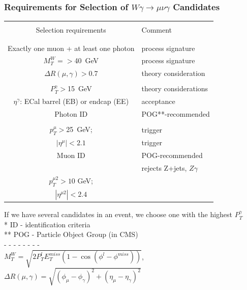 \begin{frame}\frametitle{Requirements for Selection of $W\gamma\rightarrow\mu\nu\gamma$ Candidates}
  \begin{table}[h]
     \tiny
     \begin{center}
     \begin{tabular}{|c|l|}
     \hline
      &  \\
     {\scriptsize{Selection requirements}} & {\scriptsize{Comment}} \\  
     &  \\ \hline

    {\scriptsize\bfseries\color{blue}{Event level selection criteria:}}  & \\ 
    Exactly one muon + at least one photon  & process signature\\  
     $M_T^W=>$40~GeV & process signature\\ 
     $\Delta{R}(\mu,\gamma)>$0.7 & theory consideration\\  \hline

     {\scriptsize\bfseries\color{blue}{Photon selection:}} & \\
     {\tiny{$P_T^{\gamma}>$15~GeV}} & theory considerations \\ 
     {\tiny{$\eta^{\gamma}$: ECal barrel (EB) or endcap (EE)}} & acceptance \\ 
     {\tiny{Photon ID}} & POG**-recommended \\ \hline

      {\scriptsize\bfseries\color{blue}{Muon selection:}} & \\
      \tiny{$p_T^{\mu}>$25~GeV;} & trigger\\ 
      \tiny{$|\eta^{\mu}|<2.1$} & trigger\\ 
      Muon ID & POG-recommended \\ \hline

      {\scriptsize\bfseries\color{blue}{Second muon veto:}} & rejects Z+jets, $Z\gamma$\\
      \tiny{$p_T^{\mu2}>10$ GeV;} &   \\
      \tiny{$|\eta^{\mu2}|<2.4$}  &     \\ \hline
      \end{tabular}
      \end{center}
  \end{table}
\scriptsize
If we have several candidates in an event, we choose one with the highest $P_T^{\gamma}$\\
\tiny
* ID - identification criteria\\
** POG - Particle Object Group (in CMS)\\
- - - - - - - -\\
$M_T^W=\sqrt{2  P_T^{l}  E_T^{miss}  (1-\cos{(\phi^{l}-\phi^{miss})})}$,  $\Delta{R}(\mu,\gamma)=\sqrt{ (\phi_\mu-\phi_\gamma)^2 + (\eta_\mu-\eta_\gamma)^2 }$
\end{frame}%

